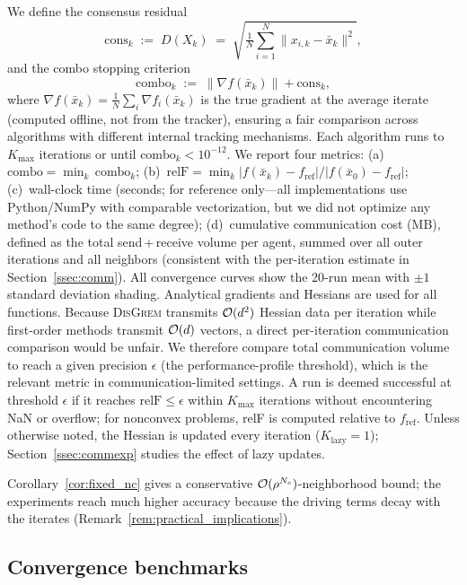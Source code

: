 \documentclass[review,onefignum,onetabnum]{siamart171218}
\begin{document}
	We define the consensus residual
	\[
	  \mathrm{cons}_k
	  \;:=\;
	  D(X_k)
	  \;=\;
	  \sqrt{\tfrac{1}{N}\textstyle\sum_{i=1}^{N}\|x_{i,k}-\bar x_k\|^{2}},
	\]
	and the combo stopping criterion
	\[
	  \mathrm{combo}_k
	  \;:=\;
	  \|\nabla f(\bar x_k)\| + \mathrm{cons}_k,
	\]
	where $\nabla f(\bar x_k)=\frac{1}{N}\sum_{i}\nabla f_i(\bar x_k)$
	is the true gradient at the average iterate (computed offline,
	not from the tracker), ensuring a fair comparison across algorithms
	with different internal tracking mechanisms.
	Each algorithm runs to $K_{\max}$ iterations or until
	$\mathrm{combo}_k < 10^{-12}$.
	We report four metrics:
	(a)~$\mathrm{combo}=\min_k\,\mathrm{combo}_k$;
	(b)~$\mathrm{relF}=\min_k |f(\bar x_k)-f_{\mathrm{ref}}|/|f(\bar x_0)-f_{\mathrm{ref}}|$;
	(c)~wall-clock time (seconds; for reference only---all implementations
	use Python/NumPy with comparable vectorization, but we did not
	optimize any method's code to the same degree);
	(d)~cumulative communication cost (MB), defined as the total
	send\,+\,receive volume per agent, summed over all outer iterations and all
	neighbors (consistent with the per-iteration estimate in Section~\ref{ssec:comm}).
	All convergence curves show the 20-run mean with $\pm1$ standard
	deviation shading.
	Analytical gradients and Hessians are used for all functions.
	Because \textsc{DisGrem} transmits $\mathcal{O}(d^2)$ Hessian data per
	iteration while first-order methods transmit $\mathcal{O}(d)$ vectors,
	a direct per-iteration communication comparison would be
	unfair.
	We therefore compare total communication volume to reach
	a given precision $\epsilon$ (the performance-profile threshold),
	which is the relevant metric in communication-limited settings.
	A run is deemed successful at threshold $\epsilon$ if it reaches
	$\mathrm{relF}\le\epsilon$ within $K_{\max}$ iterations without
	encountering NaN or overflow; for nonconvex problems, relF is
	computed relative to $f_{\mathrm{ref}}$.
	Unless otherwise noted, the Hessian is updated every iteration
	($K_{\mathrm{lazy}}{=}1$); Section~\ref{ssec:commexp} studies the
	effect of lazy updates.
	
	Corollary~\ref{cor:fixed_nc} gives a conservative
	$\mathcal{O}(\rho^{N_c})$-neighborhood bound; the experiments reach
	much higher accuracy because the driving terms decay with the
	iterates (Remark~\ref{rem:practical_implications}).
	
	\FloatBarrier
	\subsection{Convergence benchmarks}\label{ssec:convergence}
	
\end{document}
